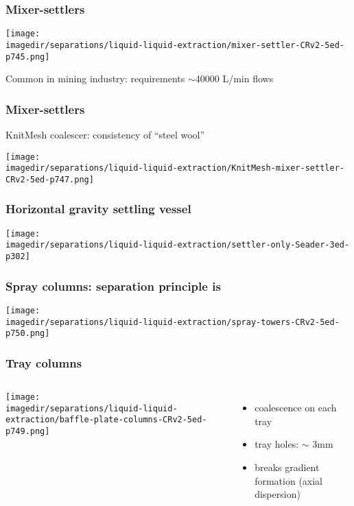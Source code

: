 \begin{frame}\frametitle{Mixer-settlers}
	\begin{center}
		\texttt{[image: \\imagedir/separations/liquid-liquid-extraction/mixer-settler-CRv2-5ed-p745.png]}
	\end{center}
	Common in mining industry: requirements $\sim$40000 L/min flows
\end{frame}

\begin{frame}\frametitle{Mixer-settlers}
	KnitMesh coalescer: consistency of ``steel wool''
	\begin{center}
		\texttt{[image: \\imagedir/separations/liquid-liquid-extraction/KnitMesh-mixer-settler-CRv2-5ed-p747.png]}
	\end{center}
\end{frame}

\begin{frame}\frametitle{Horizontal gravity settling vessel}
	\begin{center}
		\texttt{[image: \\imagedir/separations/liquid-liquid-extraction/settler-only-Seader-3ed-p302]}
	\end{center}
\end{frame}

\begin{frame}\frametitle{Spray columns: separation principle is {\color{myRed}{gravity}}}
	\begin{center}
		\texttt{[image: \\imagedir/separations/liquid-liquid-extraction/spray-towers-CRv2-5ed-p750.png]}
	\end{center}
	\vspace{-14pt}
\end{frame}

\begin{frame}\frametitle{Tray columns}
	\begin{columns}[t]
			\vspace{-0.5cm}
			\begin{center}
				\texttt{[image: \\imagedir/separations/liquid-liquid-extraction/baffle-plate-columns-CRv2-5ed-p749.png]}
			\end{center}
			\vspace{-20pt}
			\begin{itemize}
				\item	coalescence on each tray
				\item	tray holes: $\sim$ 3mm
				\item	breaks gradient formation (axial dispersion)
			\end{itemize}
	\end{columns}
\end{frame}

